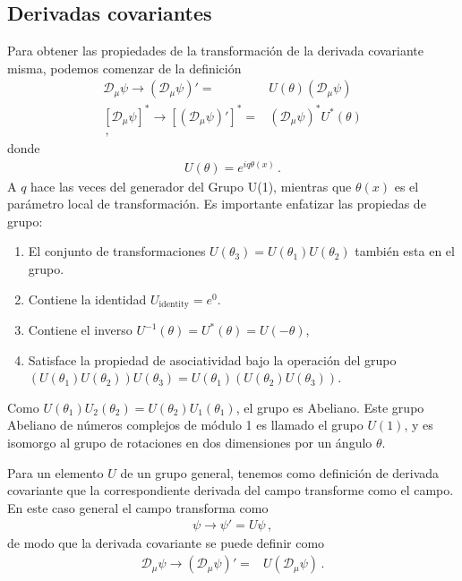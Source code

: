 \subsection{Derivadas covariantes}
\label{sec:dv}
\begin{frame}
Para obtener las propiedades de la transformación de la derivada covariante misma, podemos comenzar de la definición
\begin{align}
    \mathcal{D}_\mu \psi\to\left(\mathcal{D}_\mu \psi\right)'=&U(\theta)\left(\mathcal{D}_\mu \psi\right) \nonumber\\
    \left[ \mathcal{D}_\mu \psi  \right]^{*}\to \left[ \left(\mathcal{D}_\mu \psi\right)'  \right]^{*}=&\left(\mathcal{D}_\mu \psi\right)^{*} U^{*}(\theta) \nonumber\\
\,,
\end{align}
donde
\begin{align}
  U(\theta)=e^{iq\theta(x)}\,.
\end{align}
A $q$ hace las veces del generador del Grupo U(1), mientras que $\theta(x)$ es el parámetro local de transformación.
Es importante enfatizar las propiedas de grupo:
\begin{enumerate}
\item El conjunto de transformaciones  $U(\theta_3)=U(\theta_1)U(\theta_2)$ también esta en el grupo.
\item Contiene la identidad
$U_{\text{identity}}=e^{0}$.
\item Contiene  el inverso $U^{-1}(\theta)=U^{*}(\theta)=U(-\theta)$,
\item Satisface la propiedad de asociatividad bajo la operación del grupo $\left( U(\theta_1)U(\theta_2) \right)U (\theta_3 )=U(\theta_1)\left( U(\theta_2)U(\theta_3) \right)$. 
\end{enumerate}
Como $U(\theta_1)U_2(\theta_2)=U(\theta_2)U_1(\theta_1)$, el grupo es Abeliano. Este grupo Abeliano de números complejos de módulo 1 es llamado el grupo $U(1)$, 
y es isomorgo al grupo de rotaciones en dos dimensiones por un ángulo  $\theta$. 

\end{frame}

Para un elemento $U$ de un grupo general, tenemos como definición de derivada covariante que la correspondiente derivada del campo transforme como el campo. En este caso general el campo transforma como
\begin{align}
  \psi\to\psi'=U\psi\,,
\end{align}
de modo que la derivada covariante se puede definir como
\begin{align}
     \mathcal{D}_\mu \psi\to\left(\mathcal{D}_\mu \psi\right)'=&U\left(\mathcal{D}_\mu \psi\right)\,.
\end{align}

